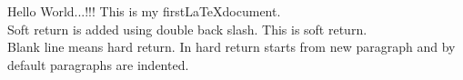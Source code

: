 \documentclass[11pt]{article}
\begin{document}
Hello World...!!! This is my first\LaTeX document.\\
Soft return is added using double back slash. This is soft return.\\

Blank line means hard return. In hard return starts from new paragraph and by default paragraphs are indented.
\end{document}

